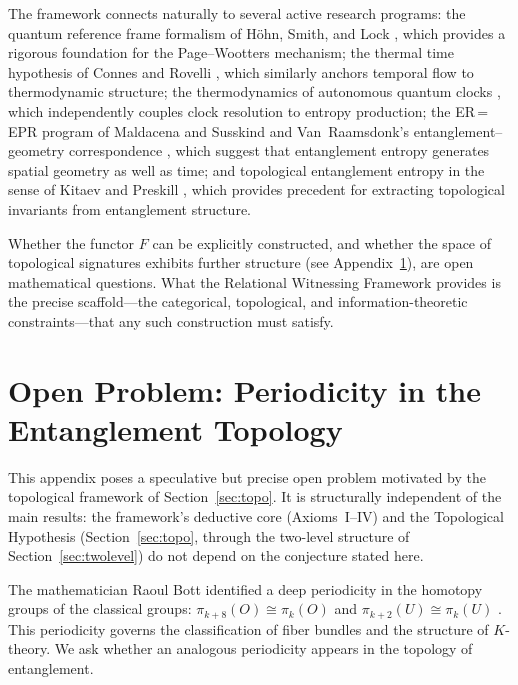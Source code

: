 \documentclass[11pt, a4paper]{article}
\begin{document}
The framework connects naturally to several active research programs: the quantum reference frame formalism of H\"{o}hn, Smith, and Lock \cite{Hohn2021}, which provides a rigorous foundation for the Page--Wootters mechanism; the thermal time hypothesis of Connes and Rovelli \cite{Connes1994}, which similarly anchors temporal flow to thermodynamic structure; the thermodynamics of autonomous quantum clocks \cite{Erker2017, Woods2019}, which independently couples clock resolution to entropy production; the ER\,=\,EPR program of Maldacena and Susskind \cite{Maldacena2013} and Van~Raamsdonk's entanglement--geometry correspondence \cite{VanRaamsdonk2010}, which suggest that entanglement entropy generates spatial geometry as well as time; and topological entanglement entropy in the sense of Kitaev and Preskill \cite{Kitaev2006}, which provides precedent for extracting topological invariants from entanglement structure.

Whether the functor $F$ can be explicitly constructed, and whether the space of topological signatures exhibits further structure (see Appendix~\ref{app:bott}), are open mathematical questions. What the Relational Witnessing Framework provides is the precise scaffold---the categorical, topological, and information-theoretic constraints---that any such construction must satisfy.

\appendix
\section{Open Problem: Periodicity in the Entanglement Topology}
\label{app:bott}

This appendix poses a speculative but precise open problem motivated by the topological framework of Section~\ref{sec:topo}. It is structurally independent of the main results: the framework's deductive core (Axioms~I--IV) and the Topological Hypothesis (Section~\ref{sec:topo}, through the two-level structure of Section~\ref{sec:twolevel}) do not depend on the conjecture stated here.

\medskip
The mathematician Raoul Bott identified a deep periodicity in the homotopy groups of the classical groups: $\pi_{k+8}(O) \cong \pi_k(O)$ and $\pi_{k+2}(U) \cong \pi_k(U)$ \cite{Bott1959}. This periodicity governs the classification of fiber bundles and the structure of $K$-theory. We ask whether an analogous periodicity appears in the topology of entanglement.
\end{document}
